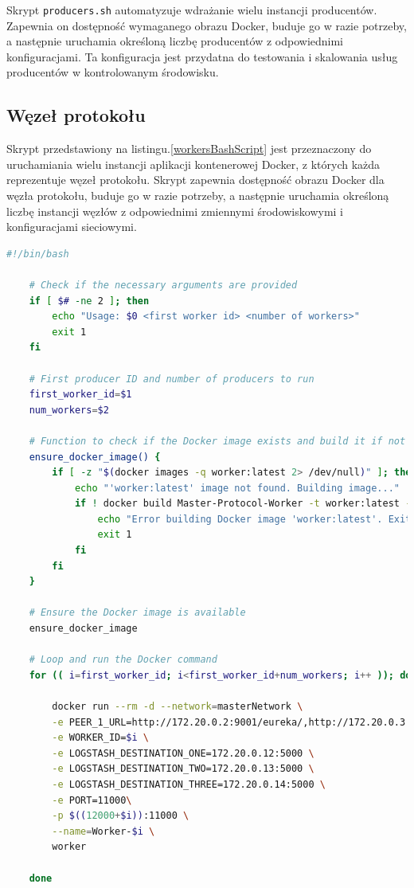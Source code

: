 Skrypt \verb|producers.sh| automatyzuje wdrażanie wielu instancji producentów. Zapewnia on dostępność wymaganego obrazu Docker, buduje go w razie potrzeby, a następnie uruchamia określoną liczbę producentów z odpowiednimi konfiguracjami. Ta konfiguracja jest przydatna do testowania i skalowania usług producentów w kontrolowanym środowisku.

\subsection{Węzeł protokołu}

Skrypt przedstawiony na listingu.\ref{workersBashScript} jest przeznaczony do uruchamiania wielu instancji aplikacji kontenerowej Docker, z których każda reprezentuje węzeł protokołu. Skrypt zapewnia dostępność obrazu Docker dla węzła protokołu, buduje go w razie potrzeby, a następnie uruchamia określoną liczbę instancji węzłów z odpowiednimi zmiennymi środowiskowymi i konfiguracjami sieciowymi.

\begin{lstlisting}[language=bash,caption=Kod skryptu workers.sh,label=workersBashScript]
    #!/bin/bash

    # Check if the necessary arguments are provided
    if [ $# -ne 2 ]; then
        echo "Usage: $0 <first worker id> <number of workers>"
        exit 1
    fi
    
    # First producer ID and number of producers to run
    first_worker_id=$1
    num_workers=$2
    
    # Function to check if the Docker image exists and build it if not
    ensure_docker_image() {
        if [ -z "$(docker images -q worker:latest 2> /dev/null)" ]; then
            echo "'worker:latest' image not found. Building image..."
            if ! docker build Master-Protocol-Worker -t worker:latest --no-cache; then
                echo "Error building Docker image 'worker:latest'. Exiting."
                exit 1
            fi
        fi
    }
    
    # Ensure the Docker image is available
    ensure_docker_image
    
    # Loop and run the Docker command
    for (( i=first_worker_id; i<first_worker_id+num_workers; i++ )); do
    
        docker run --rm -d --network=masterNetwork \
        -e PEER_1_URL=http://172.20.0.2:9001/eureka/,http://172.20.0.3:9002/eureka/,http://172.20.0.4:9003/eureka/ \
        -e WORKER_ID=$i \
        -e LOGSTASH_DESTINATION_ONE=172.20.0.12:5000 \
        -e LOGSTASH_DESTINATION_TWO=172.20.0.13:5000 \
        -e LOGSTASH_DESTINATION_THREE=172.20.0.14:5000 \
        -e PORT=11000\
        -p $((12000+$i)):11000 \
        --name=Worker-$i \
        worker
    
    done
\end{lstlisting}

